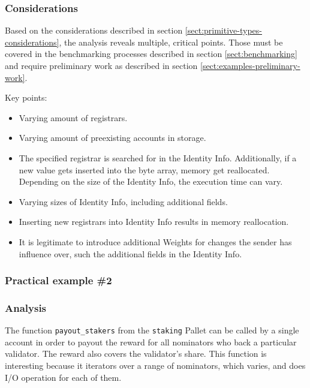 \documentclass[11pt,a4paper]{article}
\begin{document}
\subsubsection*{Considerations}

Based on the considerations described in section
\ref{sect:primitive-types-considerations}, the analysis reveals multiple,
critical points. Those must be covered in the benchmarking processes described
in section \ref{sect:benchmarking} and require preliminary work as described in
section \ref{sect:examples-preliminary-work}.
\newline

Key points:
\begin{itemize}
  \item Varying amount of registrars.
  \item Varying amount of preexisting accounts in storage.
  \item The specified registrar is searched for in the Identity Info.
  Additionally, if a new value gets inserted into the byte array, memory get
  reallocated. Depending on the size of the Identity Info, the execution time
  can vary.
  \item Varying sizes of Identity Info, including additional fields.
  \item Inserting new registrars into Identity Info results in memory
  reallocation.
  \item It is legitimate to introduce additional Weights for changes the sender
  has influence over, such the additional fields in the Identity Info.
\end{itemize}

\subsubsection{Practical example \#2}

\subsubsection*{Analysis}

The function \verb|payout_stakers| from the \verb|staking| Pallet can be called
by a single account in order to payout the reward for all nominators who back a
particular validator. The reward also covers the validator's share. This
function is interesting because it iterators over a range of nominators, which
varies, and does I/O operation for each of them.
\newline
\end{document}

